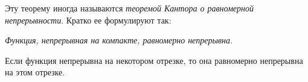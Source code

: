 Эту теорему иногда называются \textit{теоремой Кантора о равномерной непрерывности}. Кратко ее формулируют так:

\textit{Функция, непрерывная на компакте, равномерно непрерывна.}
\begin{cons}
Если функция непрерывна на некотором отрезке, то она равномерно непрерывна на этом отрезке. 
\end{cons}

















